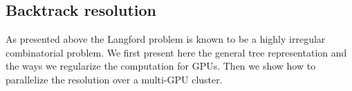 %
%
%

\subsection{Backtrack resolution}

As presented above the Langford problem is known to be a highly irregular combinatorial problem. 
We first present here the general tree representation and the ways we regularize the computation for GPUs.
Then we show how to parallelize the resolution over a multi-GPU cluster.

